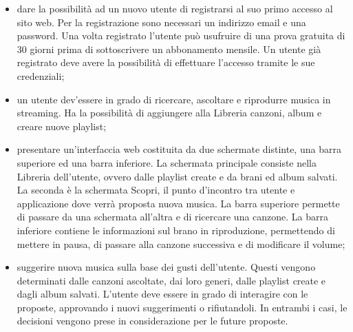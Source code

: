 \documentclass[a4paper,12pt]{article}
\begin{document}
\begin{itemize}
    \item dare la possibilità ad un nuovo utente di registrarsi al suo primo accesso al sito web. Per la registrazione sono necessari un indirizzo email e una password. Una volta registrato l’utente può usufruire di una prova gratuita di 30 giorni prima di sottoscrivere un abbonamento  mensile. Un utente già registrato deve avere la possibilità di effettuare l’accesso tramite le sue credenziali;
    \item un utente dev’essere in grado di ricercare, ascoltare e riprodurre musica in streaming. Ha la possibilità di aggiungere alla Libreria canzoni, album e creare nuove playlist;
    \item presentare un’interfaccia web costituita da due schermate distinte, una barra superiore ed una barra inferiore. La schermata principale consiste nella Libreria dell’utente, ovvero dalle playlist create e da brani ed album salvati. La seconda è la schermata Scopri, il punto d’incontro tra utente e applicazione dove verrà proposta nuova musica. La barra superiore permette di passare da una schermata all’altra e di ricercare una canzone. La barra inferiore contiene le informazioni sul brano in riproduzione, permettendo di mettere in pausa, di passare alla canzone successiva e di modificare il volume;
    \item suggerire nuova musica sulla base dei gusti dell’utente. Questi vengono determinati dalle canzoni ascoltate, dai loro generi, dalle playlist create e dagli album salvati. L’utente deve essere in grado di interagire con le proposte, approvando i nuovi suggerimenti o rifiutandoli. In entrambi i casi, le decisioni vengono prese in considerazione per le future proposte.
\end{itemize}
\end{document}
